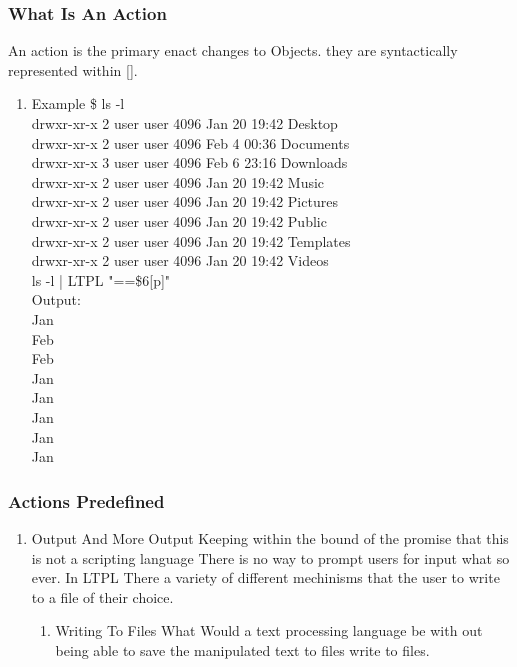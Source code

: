 \documentclass[11pt]{article}
\begin{document}
\subsubsection{What Is An Action}
\label{sec:org6a05157}
An action is the primary enact changes to Objects. they are syntactically represented within [].
\begin{enumerate}
\item Example
\label{sec:org6e22429}
\$ ls -l \\
drwxr-xr-x 2 user user  4096 Jan 20 19:42 Desktop \\
drwxr-xr-x 2 user user  4096 Feb  4 00:36 Documents \\
drwxr-xr-x 3 user user  4096 Feb  6 23:16 Downloads \\
drwxr-xr-x 2 user user  4096 Jan 20 19:42 Music \\
drwxr-xr-x 2 user user  4096 Jan 20 19:42 Pictures \\
drwxr-xr-x 2 user user  4096 Jan 20 19:42 Public \\
drwxr-xr-x 2 user user  4096 Jan 20 19:42 Templates \\
drwxr-xr-x 2 user user  4096 Jan 20 19:42 Videos \\

ls -l | LTPL "==\$6[p]" \\

Output: \\
Jan \\
Feb \\
Feb \\
Jan \\
Jan \\
Jan \\
Jan \\
Jan \\
\end{enumerate}

\subsubsection{Actions Predefined}
\label{sec:orgac29086}
\begin{enumerate}
\item Output And More Output
\label{sec:orgcaf2010}
Keeping within the bound of the promise that this is not a scripting language There is no way to prompt users for input what so ever.
In LTPL There a variety of different mechinisms that the user to write to a file of their choice.
\begin{enumerate}
\item Writing To Files
\label{sec:org11669c3}
What Would a text processing language be with out being able to save the manipulated text to files write to files.
\end{enumerate}
\end{enumerate}
\end{document}
